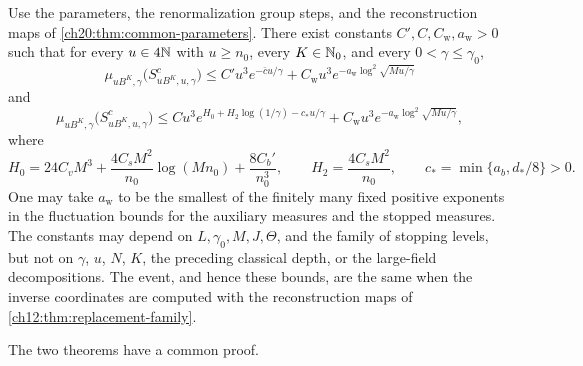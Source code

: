 \begin{theorem}\label{ch20:thm:literal-payment}
Use the parameters, the renormalization group steps, and the reconstruction maps of \cref{ch20:thm:common-parameters}. There exist constants $C',C,C_{\mathrm w},a_{\mathrm w}>0$ such that for every $u\in4\mathbb N$ with $u\ge n_0$, every $K\in\mathbb N_0$, and every $0<\gamma\le\gamma_0$,
\[
 \mu_{uB^K,\gamma}\bigl(S_{uB^K,u,\gamma}^c\bigr)\le C'u^3e^{-\bar cu/\gamma}+C_{\mathrm w}u^3e^{-a_{\mathrm w}\log^2\sqrt{Mu/\gamma}}
\]
and
\[
 \mu_{uB^K,\gamma}\bigl(S_{uB^K,u,\gamma}^c\bigr)\le Cu^3e^{H_0+H_2\log(1/\gamma)-c_*u/\gamma}+C_{\mathrm w}u^3e^{-a_{\mathrm w}\log^2\sqrt{Mu/\gamma}},
\]
where
\[
 H_0=24C_vM^3+\frac{4C_sM^2}{n_0}\log(Mn_0)+\frac{8C_b'}{n_0^3},\qquad
 H_2=\frac{4C_sM^2}{n_0},\qquad c_*=\min\{a_b,d_*/8\}>0.
\]
One may take $a_{\mathrm w}$ to be the smallest of the finitely many fixed positive exponents in the fluctuation bounds for the auxiliary measures and the stopped measures. The constants may depend on $L,\gamma_0,M,J,\Theta$, and the family of stopping levels, but not on $\gamma$, $u$, $N$, $K$, the preceding classical depth, or the large-field decompositions. The event, and hence these bounds, are the same when the inverse coordinates are computed with the reconstruction maps of \cref{ch12:thm:replacement-family}.
\end{theorem}

The two theorems have a common proof.


